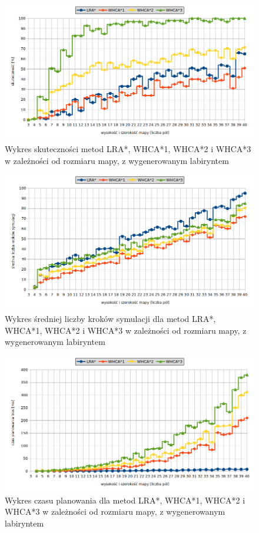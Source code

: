 \begin{figure}
	\centering
	\includegraphics[width=0.8\columnwidth]{img/plots/test-steps-maze-mapsize-eff}
	\caption{Wykres skuteczności metod LRA*, WHCA*1, WHCA*2 i WHCA*3 w zależności od rozmiaru mapy, z wygenerowanym labiryntem}
	\label{fig:test-steps-maze-mapsize-eff}
\end{figure}
\begin{figure}
	\centering
	\includegraphics[width=0.8\columnwidth]{img/plots/test-steps-maze-mapsize-steps}
	\caption{Wykres średniej liczby kroków symulacji dla metod LRA*, WHCA*1, WHCA*2 i WHCA*3 w zależności od rozmiaru mapy, z wygenerowanym labiryntem}
	\label{fig:test-steps-maze-mapsize-steps}
\end{figure}
\begin{figure}
	\centering
	\includegraphics[width=0.8\columnwidth]{img/plots/test-steps-maze-mapsize-calctime}
	\caption{Wykres czasu planowania dla metod LRA*, WHCA*1, WHCA*2 i WHCA*3 w zależności od rozmiaru mapy, z wygenerowanym labiryntem}
	\label{fig:test-steps-maze-mapsize-calctime}
\end{figure}
